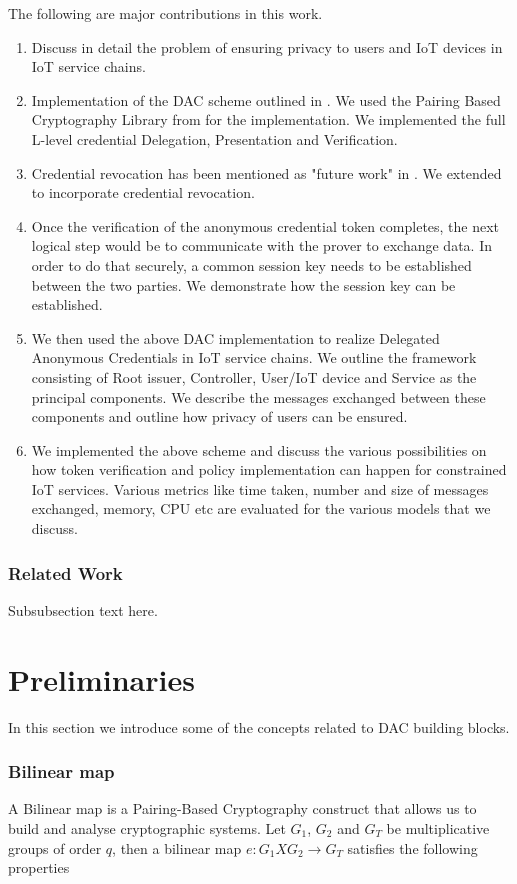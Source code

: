 \documentclass[journal]{IEEEtran}
\begin{document}
The following are major contributions in this work.
\begin{enumerate}[label=\alph*)]
	\item Discuss in detail the problem of ensuring privacy to users and IoT devices in IoT service chains.
	\item Implementation of the DAC scheme outlined in \cite{CamenischDD17}. We used the Pairing Based Cryptography Library from \cite{pbc} for the implementation. We implemented the full L-level credential Delegation, Presentation and Verification.
	\item Credential revocation has been mentioned as "future work" in \cite{CamenischDD17}. We extended \cite{CamenischDD17} to incorporate credential revocation.
	\item Once the verification of the anonymous credential token completes, the next logical step would be to communicate with the prover to exchange data. In order to do that securely, a common session key needs to be established between the two parties. We demonstrate how the session key can be established.
	\item We then used the above DAC implementation to realize Delegated Anonymous Credentials in IoT service chains. We outline the framework consisting of Root issuer, Controller, User/IoT device and Service as the principal components. We describe the messages exchanged between these components and outline how privacy of users can be ensured.
	\item We implemented the above scheme and discuss the various possibilities on how token verification and policy implementation can happen for constrained IoT services. Various metrics like time taken, number and size of messages exchanged, memory, CPU etc are evaluated for the various models that we discuss. 
\end{enumerate}

\subsubsection{Related Work}
Subsubsection text here.

\section{Preliminaries} \label{preliminaries}
In this section we introduce some of the concepts related to DAC building blocks. 

\subsubsection{Bilinear map}
A Bilinear map is a Pairing-Based Cryptography construct that allows us to build and analyse cryptographic systems. Let $G_1$, $G_2$ and $G_T$ be multiplicative groups of order $q$, then a bilinear map $e : G_1 X G_2\rightarrow G_T$ satisfies the following properties
\end{document}
